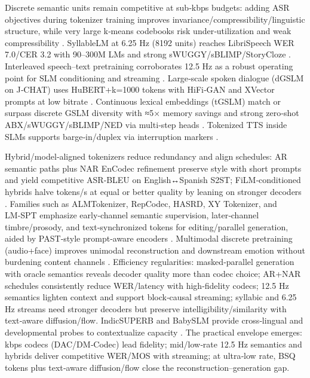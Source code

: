 Discrete semantic units remain competitive at sub‑kbps budgets: adding ASR objectives during tokenizer training improves invariance/compressibility/linguistic structure, while very large k‑means codebooks risk under‑utilization and weak compressibility \cite{vashishth2024stabspeechtokenizerassessmentbenchmark}. SyllableLM at 6.25 Hz (8192 units) reaches LibriSpeech WER 7.0/CER 3.2 with 90–300M LMs and strong sWUGGY/sBLIMP/StoryCloze \cite{baade2024syllablelmlearningcoarsesemanticunitsspe}. Interleaved speech–text pretraining corroborates 12.5 Hz as a robust operating point for SLM conditioning and streaming \cite{zeng2024scalingspeechtextpretrainingsyntheticint}. Large‑scale spoken dialogue (dGSLM on J‑CHAT) uses HuBERT+k=1000 tokens with HiFi‑GAN and XVector prompts at low bitrate \cite{nakata2024jchatjapaneselargescalespokendialoguecor}. Continuous lexical embeddings (tGSLM) match or surpass discrete GSLM diversity with ≈5× memory savings and strong zero‑shot ABX/sWUGGY/sBLIMP/NED via multi‑step heads \cite{algayres2023generativespokenlanguagemodelbasedcontin}. Tokenized TTS inside SLMs supports barge‑in/duplex via interruption markers \cite{ma2024languagemodelcanlistenwhilespeaking}.

Hybrid/model‑aligned tokenizers reduce redundancy and align schedules: AR semantic paths plus NAR EnCodec refinement preserve style with short prompts and yield competitive ASR‑BLEU on English↔Spanish S2ST; FiLM‑conditioned hybrids halve tokens/s at equal or better quality by leaning on stronger decoders \cite{peng2024mslms2stmultitaskspeechlanguagemodeltext,yang2025diffsoundstreamefficientspeechtokenizati}. Families such as ALMTokenizer, RepCodec, HASRD, XY Tokenizer, and LM‑SPT emphasize early‑channel semantic supervision, later‑channel timbre/prosody, and text‑synchronized tokens for editing/parallel generation, aided by PAST‑style prompt‑aware encoders \cite{guo2025recentadvancesdiscretespeechtokensreview}. Multimodal discrete pretraining (audio+face) improves unimodal reconstruction and downstream emotion without burdening content channels \cite{sadok2025vectorquantizedmaskedautoencoderaudiovis}. Efficiency regularities: masked‑parallel generation with oracle semantics reveals decoder quality more than codec choice; AR+NAR schedules consistently reduce WER/latency with high‑fidelity codecs; 12.5 Hz semantics lighten context and support block‑causal streaming; syllabic and 6.25 Hz streams need stronger decoders but preserve intelligibility/similarity with text‑aware diffusion/flow. IndicSUPERB and BabySLM provide cross‑lingual and developmental probes to contextualize capacity \cite{fily2024establishingdegreesclosenessbetweenaudio,lavechin2023babyslmlanguageacquisitionfriendlybenchm,entry2025indicsuperbspeechprocessinguniversalperf}. The practical envelope emerges: kbps codecs (DAC/DM‑Codec) lead fidelity; mid/low‑rate 12.5 Hz semantics and hybrids deliver competitive WER/MOS with streaming; at ultra‑low rate, BSQ tokens plus text‑aware diffusion/flow close the reconstruction–generation gap.

